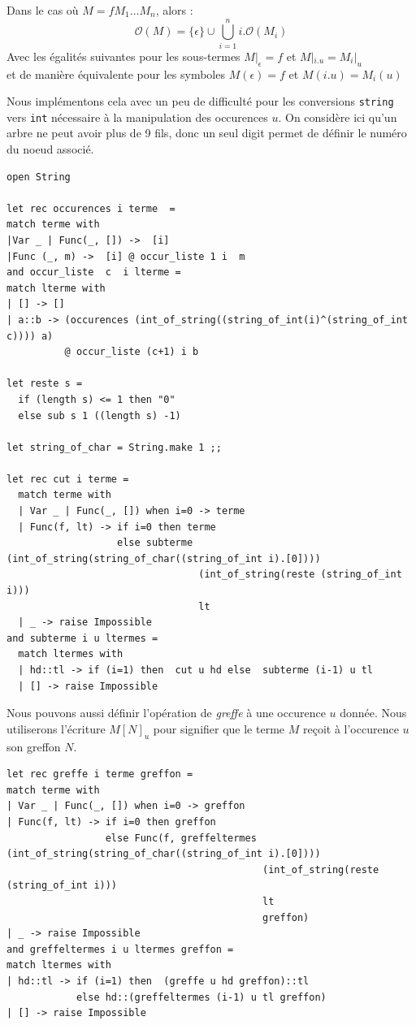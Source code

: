 \documentclass[11pt]{book}
\begin{document}
\vspace{0.5cm}

\noindent Dans le cas où $M = f M_1\dots M_n$, alors :
$$\mathcal{O}(M) = \{\epsilon\} \cup \bigcup_{i=1}^n i. \mathcal{O}(M_i)$$
Avec les égalités suivantes pour les sous-termes $M|_\epsilon = f$ et $M|_{i.u}=M_i|_u $ \\
et de manière équivalente pour les symboles $M(\epsilon) = f$ et $M(i.u)=M_i(u) $

Nous implémentons cela avec un peu de difficulté pour les conversions 
\verb+string+ vers \verb+int+ nécessaire à la manipulation des occurences $u$. 
On considère ici qu'un arbre ne peut avoir plus de 9 fils, donc un seul digit permet de définir le numéro du noeud associé.
\begin{Verbatim}
open String

let rec occurences i terme  =
match terme with
|Var _ | Func(_, []) ->  [i]
|Func (_, m) ->  [i] @ occur_liste 1 i  m 
and occur_liste  c  i lterme =
match lterme with
| [] -> []
| a::b -> (occurences (int_of_string((string_of_int(i)^(string_of_int c)))) a) 
          @ occur_liste (c+1) i b

let reste s =
  if (length s) <= 1 then "0"
  else sub s 1 ((length s) -1)

let string_of_char = String.make 1 ;;

let rec cut i terme =
  match terme with
  | Var _ | Func(_, []) when i=0 -> terme
  | Func(f, lt) -> if i=0 then terme 
                   else subterme (int_of_string(string_of_char((string_of_int i).[0])))
                                 (int_of_string(reste (string_of_int i)))
                                 lt
  | _ -> raise Impossible
and subterme i u ltermes =
  match ltermes with
  | hd::tl -> if (i=1) then  cut u hd else  subterme (i-1) u tl
  | [] -> raise Impossible

\end{Verbatim}
Nous pouvons aussi définir l'opération de \textit{greffe} à une occurence $u$ donnée. Nous utiliserons
l'écriture $M[N]_u$ pour signifier que le terme $M$ reçoit à l'occurence $u$ son greffon $N$.
\begin{Verbatim}
let rec greffe i terme greffon =
match terme with
| Var _ | Func(_, []) when i=0 -> greffon
| Func(f, lt) -> if i=0 then greffon 
				 else Func(f, greffeltermes (int_of_string(string_of_char((string_of_int i).[0]))) 
				  			                (int_of_string(reste (string_of_int i)))  
								            lt
								            greffon)
| _ -> raise Impossible
and greffeltermes i u ltermes greffon =
match ltermes with
| hd::tl -> if (i=1) then  (greffe u hd greffon)::tl  
            else hd::(greffeltermes (i-1) u tl greffon)
| [] -> raise Impossible
\end{Verbatim}
\end{document}
